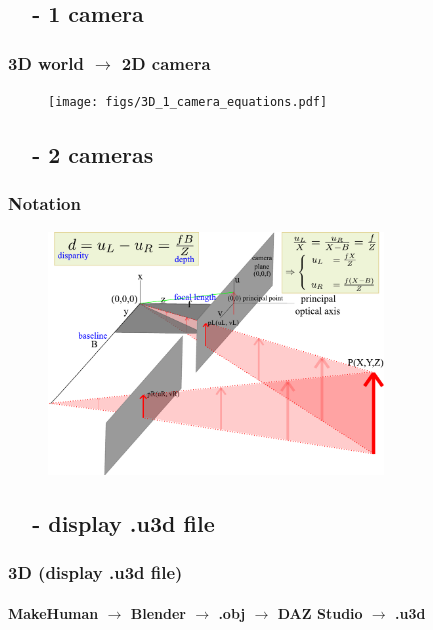 \subsection{\ \ - 1 camera}
\begin{frame}\frametitle{3D world $\rightarrow$ 2D camera}\logoEvolution\mypagenum
	\begin{figure}
		\texttt{[image: figs/3D\_1\_camera\_equations.pdf]}
	\end{figure}
\end{frame}





\subsection{\ \ - 2 cameras}
\begin{frame}\frametitle{Notation}\logoEvolution\mypagenum
	\begin{figure}		
		\includegraphics[width=3.5in]{figs/3D_2_cameras_blockDiagram.pdf}
	\end{figure}
\end{frame}	


\subsection{\ \ - display .u3d file}

\begin{frame}
\frametitle{3D (display .u3d file)}
\framesubtitle{MakeHuman $\rightarrow$ Blender $\rightarrow$ .obj $\rightarrow$ DAZ Studio $\rightarrow$ .u3d}
\mypagenum
\\
\end{frame}



